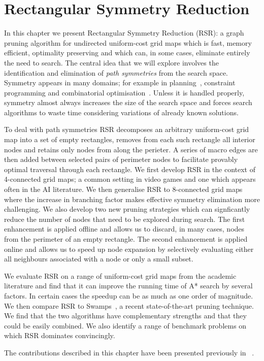 \chapter{Rectangular Symmetry Reduction}
\label{cha::rsr} 
In this chapter we present Rectangular Symmetry Reduction (RSR): a graph
pruning algorithm for undirected uniform-cost grid maps which is fast, memory
efficient, optimality preserving and which can, in some cases, eliminate
entirely the need to search.  The central idea that we will explore involves
the identification and elimination of \emph{path symmetries} from the search
space.  Symmetry appears in many domains; for example in
planning~\citep{fox99}, constraint programming \citep{walsh07} and
combinatorial optimisation~\citep{fukunaga08}.  Unless it is handled properly,
symmetry almost always increases the size of the search space and forces
search algorithms to waste time considering variations of already known
solutions.
\par
To deal with path symmetries RSR decomposes an arbitrary uniform-cost grid map
into a set of empty rectangles, removes from each such rectangle all interior
nodes and retains only nodes from along the perieter.  A series of macro edges
are then added between selected pairs of perimeter nodes to facilitate
provably optimal traversal through each rectangle.  We first develop RSR in
the context of 4-connected grid maps; a common setting in video games and one
which appears often in the AI literature.  We then generalise RSR to
8-connected grid maps where the increase in branching factor makes effective
symmetry elimination more challenging.  We also develop two new pruning
strategies which can signficantly reduce the number of nodes that need to be
explored during search.  The first enhancement is applied offline and allows
us to discard, in many cases, nodes from the perimeter of an empty rectangle.
The second enhancement is applied online and allows us to speed up node
expansion by selectively evaluating either all neighbours associated with a
node or only a small subset.

We evaluate RSR on a range of uniform-cost grid maps from the academic
literature and find that it can improve the running time of A* search by
several factors. In certain cases the speedup can be as much as one order of
magnitude. We then compare RSR to Swamps~\citep{pochter10}, a recent
state-of-the-art pruning technique. We find that the two algorithms have
complementary strengths and that they could be easily combined. We also
identify a range of benchmark problems on which RSR dominates convincingly.
\par

The contributions described in this chapter have been presented previously in
~\citep{harabor10,harabor11a,harabor11c}.

